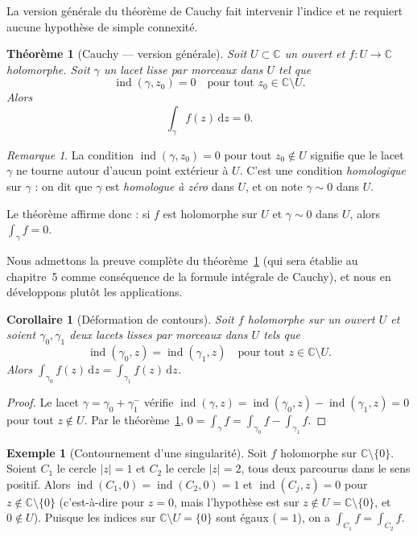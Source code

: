 \documentclass[12pt,a4paper,openany]{book}
\theoremstyle{definition}
\newtheorem{exemple}[definition]{Exemple}
\theoremstyle{plain}
\newtheorem{theoreme}[definition]{Théorème}
\newtheorem{corollaire}[definition]{Corollaire}
\theoremstyle{remark}
\newtheorem{remarque}[definition]{Remarque}
\newcommand{\C}{\mathbb{C}}
\DeclareMathOperator{\ind}{ind}
\newcommand{\dd}{\mathrm{d}}
\newcommand{\abs}[1]{\left|#1\right|}
\begin{document}
La version générale du théorème de Cauchy fait intervenir l'indice et ne
requiert aucune hypothèse de simple connexité.

\begin{theoreme}[Cauchy --- version générale]\label{thm:cauchy-general}
Soit $U \subset \C$ un ouvert et $f \colon U \to \C$ holomorphe. Soit
$\gamma$ un lacet lisse par morceaux dans $U$ tel que
\[
  \ind(\gamma, z_0) = 0 \quad \text{pour tout } z_0 \in \C \setminus U.
\]
Alors
\[
  \int_\gamma f(z)\,\dd z = 0.
\]
\end{theoreme}

\begin{remarque}\label{rem:cauchy-general-interpretation}
La condition $\ind(\gamma, z_0) = 0$ pour tout $z_0 \notin U$ signifie que le
lacet $\gamma$ ne tourne autour d'aucun point extérieur à $U$. C'est une
condition \emph{homologique} sur $\gamma$ : on dit que $\gamma$ est
\emph{homologue à zéro} dans $U$, et on note
$\gamma \sim 0$ dans $U$.

Le théorème affirme donc : si $f$ est holomorphe sur $U$ et $\gamma \sim 0$
dans $U$, alors $\int_\gamma f = 0$.
\end{remarque}

Nous admettons la preuve complète du théorème~\ref{thm:cauchy-general}
(qui sera établie au chapitre~5 comme conséquence de la formule intégrale
de Cauchy), et nous en développons plutôt les applications.

\begin{corollaire}[Déformation de contours]\label{cor:deformation-contours}
Soit $f$ holomorphe sur un ouvert $U$ et soient $\gamma_0, \gamma_1$ deux
lacets lisses par morceaux dans $U$ tels que
\[
  \ind(\gamma_0, z) = \ind(\gamma_1, z) \quad \text{pour tout }
  z \in \C \setminus U.
\]
Alors $\displaystyle \int_{\gamma_0} f(z)\,\dd z = \int_{\gamma_1} f(z)\,\dd z$.
\end{corollaire}

\begin{proof}
Le lacet $\gamma = \gamma_0 + \gamma_1^-$ vérifie $\ind(\gamma, z) =
\ind(\gamma_0, z) - \ind(\gamma_1, z) = 0$ pour tout $z \notin U$.
Par le théorème~\ref{thm:cauchy-general},
$0 = \int_\gamma f = \int_{\gamma_0} f - \int_{\gamma_1} f$.
\end{proof}

\begin{exemple}[Contournement d'une singularité]\label{ex:contournement}
Soit $f$ holomorphe sur $\C \setminus \{0\}$. Soient $C_1$ le cercle
$\abs{z} = 1$ et $C_2$ le cercle $\abs{z} = 2$, tous deux parcourus dans le
sens positif. Alors $\ind(C_1, 0) = \ind(C_2, 0) = 1$ et
$\ind(C_j, z) = 0$ pour $z \notin \C \setminus \{0\}$ (c'est-à-dire pour
$z = 0$, mais l'hypothèse est sur $z \notin U = \C\setminus\{0\}$, et
$0 \notin U$). Puisque les indices sur $\C \setminus U = \{0\}$ sont égaux
($= 1$), on a $\int_{C_1} f = \int_{C_2} f$.
\end{exemple}
\end{document}
